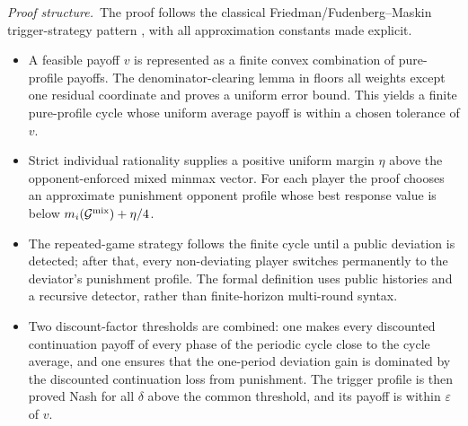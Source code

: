 \noindent\emph{Proof structure.}\ The proof follows the classical
Friedman/Fudenberg--Maskin trigger-strategy pattern
\citep{Friedman1971,FudenbergMaskin1986}, with all approximation
constants made explicit.
\begin{itemize}\itemsep2pt
\item A feasible payoff $v$ is represented as a finite convex
combination of pure-profile payoffs.  The denominator-clearing
lemma in  floors all weights
except one residual coordinate and proves a uniform error bound.
This yields a finite pure-profile cycle whose uniform average
payoff is within a chosen tolerance of $v$.

\item Strict individual rationality supplies a positive uniform
margin $\eta$ above the opponent-enforced mixed minmax vector.
For each player the proof chooses an approximate punishment
opponent profile whose best response value is below
$m_i(\mathcal{G}^{\mathrm{mix}})+\eta/4$.

\item The repeated-game strategy follows the finite cycle until a
public deviation is detected; after that, every non-deviating
player switches permanently to the deviator's punishment profile.
The formal definition uses public histories and a recursive
 detector, rather than finite-horizon
multi-round syntax.

\item Two discount-factor thresholds are combined: one makes every
discounted continuation payoff of every phase of the periodic
cycle close to the cycle average, and one ensures that the
one-period deviation gain is dominated by the discounted
continuation loss from punishment.  The trigger profile is then
proved Nash for all $\delta$ above the common threshold, and its
payoff is within $\varepsilon$ of $v$.
\end{itemize}


